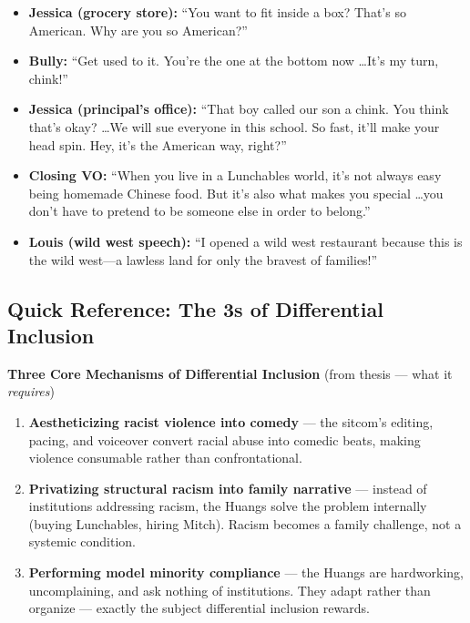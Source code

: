 \documentclass[12pt]{article}
\begin{document}
\begin{itemize}\setlength{\itemsep}{2pt}
\item \textbf{Jessica (grocery store):} ``You want to fit inside a box? That's so American. Why are you so American?''
\item \textbf{Bully:} ``Get used to it. You're the one at the bottom now \ldots It's my turn, chink!''
\item \textbf{Jessica (principal's office):} ``That boy called our son a chink. You think that's okay? \ldots We will sue everyone in this school. So fast, it'll make your head spin. Hey, it's the American way, right?''
\item \textbf{Closing VO:} ``When you live in a Lunchables world, it's not always easy being homemade Chinese food. But it's also what makes you special \ldots you don't have to pretend to be someone else in order to belong.''
\item \textbf{Louis (wild west speech):} ``I opened a wild west restaurant because this is the wild west---a lawless land for only the bravest of families!''
\end{itemize}

\vspace{12pt}
\subsection*{Quick Reference: The 3s of Differential Inclusion}

\renewcommand{\arraystretch}{1.4}
\normalsize

\textbf{Three Core Mechanisms of Differential Inclusion} {\small (from thesis --- what it \textit{requires})}

\begin{enumerate}\setlength{\itemsep}{2pt}
\item \textbf{Aestheticizing racist violence into comedy} --- the sitcom's editing, pacing, and voiceover convert racial abuse into comedic beats, making violence consumable rather than confrontational.
\item \textbf{Privatizing structural racism into family narrative} --- instead of institutions addressing racism, the Huangs solve the problem internally (buying Lunchables, hiring Mitch). Racism becomes a family challenge, not a systemic condition.
\item \textbf{Performing model minority compliance} --- the Huangs are hardworking, uncomplaining, and ask nothing of institutions. They adapt rather than organize --- exactly the subject differential inclusion rewards.
\end{enumerate}
\end{document}
